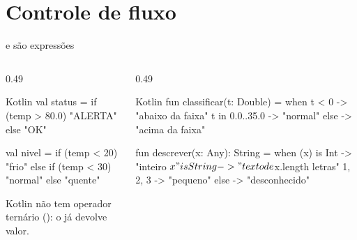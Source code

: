 \documentclass[aspectratio=169,10pt]{beamer}
\begin{document}
\section{Controle de fluxo}

\begin{frame}[fragile]{ e  são expressões}
  \begin{columns}[T]
    \begin{column}{0.49\textwidth}
\begin{codigo}[title=if como expressão]{Kotlin}
val status = if (temp > 80.0) "ALERTA" else "OK"

val nivel = if (temp < 20) {
  "frio"
} else if (temp < 30) {
  "normal"
} else {
  "quente"
}
\end{codigo}
      \begin{dica}
        Kotlin não tem operador ternário (): o  já devolve valor.
      \end{dica}
    \end{column}
    \begin{column}{0.49\textwidth}
\begin{codigo}[title=when: o switch turbinado]{Kotlin}
fun classificar(t: Double) = when {
  t < 0      -> "abaixo da faixa"
  t in 0.0..35.0 -> "normal"
  else       -> "acima da faixa"
}

fun descrever(x: Any): String = when (x) {
  is Int    -> "inteiro $x"
  is String -> "texto de ${x.length} letras"
  1, 2, 3   -> "pequeno"
  else      -> "desconhecido"
}
\end{codigo}
    \end{column}
  \end{columns}
\end{frame}
\end{document}
